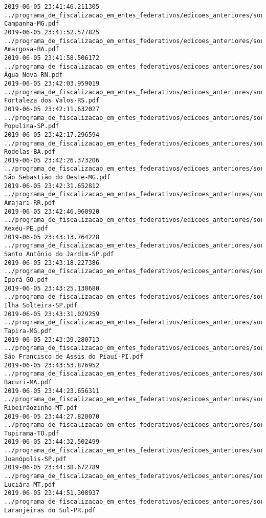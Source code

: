 \begin{lstlisting}
2019-06-05 23:41:46.211305 ../programa_de_fiscalizacao_em_entes_federativos/edicoes_anteriores/sorteio_37/2825-Campanha-MG.pdf
2019-06-05 23:41:52.577825 ../programa_de_fiscalizacao_em_entes_federativos/edicoes_anteriores/sorteio_37/2813-Amargosa-BA.pdf
2019-06-05 23:41:58.506172 ../programa_de_fiscalizacao_em_entes_federativos/edicoes_anteriores/sorteio_37/2785-Água Nova-RN.pdf
2019-06-05 23:42:03.959019 ../programa_de_fiscalizacao_em_entes_federativos/edicoes_anteriores/sorteio_37/2767-Fortaleza dos Valos-RS.pdf
2019-06-05 23:42:11.632027 ../programa_de_fiscalizacao_em_entes_federativos/edicoes_anteriores/sorteio_37/2817-Populina-SP.pdf
2019-06-05 23:42:17.296594 ../programa_de_fiscalizacao_em_entes_federativos/edicoes_anteriores/sorteio_37/2867-Rodelas-BA.pdf
2019-06-05 23:42:26.373206 ../programa_de_fiscalizacao_em_entes_federativos/edicoes_anteriores/sorteio_37/2787-São Sebastião do Oeste-MG.pdf
2019-06-05 23:42:31.652812 ../programa_de_fiscalizacao_em_entes_federativos/edicoes_anteriores/sorteio_37/2863-Amajari-RR.pdf
2019-06-05 23:42:46.960920 ../programa_de_fiscalizacao_em_entes_federativos/edicoes_anteriores/sorteio_37/2857-Xexéu-PE.pdf
2019-06-05 23:43:13.764228 ../programa_de_fiscalizacao_em_entes_federativos/edicoes_anteriores/sorteio_37/2829-Santo Antônio do Jardim-SP.pdf
2019-06-05 23:43:18.227386 ../programa_de_fiscalizacao_em_entes_federativos/edicoes_anteriores/sorteio_37/2791-Iporá-GO.pdf
2019-06-05 23:43:25.130680 ../programa_de_fiscalizacao_em_entes_federativos/edicoes_anteriores/sorteio_37/2771-Ilha Solteira-SP.pdf
2019-06-05 23:43:31.029259 ../programa_de_fiscalizacao_em_entes_federativos/edicoes_anteriores/sorteio_37/2769-Tapira-MG.pdf
2019-06-05 23:43:39.280713 ../programa_de_fiscalizacao_em_entes_federativos/edicoes_anteriores/sorteio_37/2803-São Francisco de Assis do Piauí-PI.pdf
2019-06-05 23:43:53.876952 ../programa_de_fiscalizacao_em_entes_federativos/edicoes_anteriores/sorteio_37/2833-Bacuri-MA.pdf
2019-06-05 23:44:23.656311 ../programa_de_fiscalizacao_em_entes_federativos/edicoes_anteriores/sorteio_37/2875-Ribeirãozinho-MT.pdf
2019-06-05 23:44:27.820070 ../programa_de_fiscalizacao_em_entes_federativos/edicoes_anteriores/sorteio_37/2873-Tupirama-TO.pdf
2019-06-05 23:44:32.502499 ../programa_de_fiscalizacao_em_entes_federativos/edicoes_anteriores/sorteio_37/2841-Joanópolis-SP.pdf
2019-06-05 23:44:38.672789 ../programa_de_fiscalizacao_em_entes_federativos/edicoes_anteriores/sorteio_37/2853-Luciára-MT.pdf
2019-06-05 23:44:51.308937 ../programa_de_fiscalizacao_em_entes_federativos/edicoes_anteriores/sorteio_37/2851-Laranjeiras do Sul-PR.pdf

\end{lstlisting}
